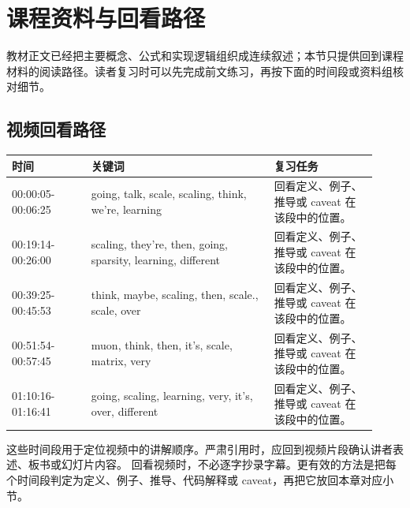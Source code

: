 \documentclass[a4paper]{article}
\begin{document}
\section{课程资料与回看路径}
教材正文已经把主要概念、公式和实现逻辑组织成连续叙述；本节只提供回到课程材料的阅读路径。读者复习时可以先完成前文练习，再按下面的时间段或资料组核对细节。
\subsection{视频回看路径}
\begin{longtable}{p{0.20\linewidth}p{0.46\linewidth}p{0.26\linewidth}}
\toprule
\textbf{时间} & \textbf{关键词} & \textbf{复习任务}\\
\midrule
00:00:05-00:06:25 & going, talk, scale, scaling, think, we're, learning & 回看定义、例子、推导或 caveat 在该段中的位置。\\
00:19:14-00:26:00 & scaling, they're, then, going, sparsity, learning, different & 回看定义、例子、推导或 caveat 在该段中的位置。\\
00:39:25-00:45:53 & think, maybe, scaling, then, scale., scale, over & 回看定义、例子、推导或 caveat 在该段中的位置。\\
00:51:54-00:57:45 & muon, think, then, it's, scale, matrix, very & 回看定义、例子、推导或 caveat 在该段中的位置。\\
01:10:16-01:16:41 & going, scaling, learning, very, it's, over, different & 回看定义、例子、推导或 caveat 在该段中的位置。\\
\bottomrule
\end{longtable}
这些时间段用于定位视频中的讲解顺序。严肃引用时，应回到视频片段确认讲者表述、板书或幻灯片内容。
回看视频时，不必逐字抄录字幕。更有效的方法是把每个时间段判定为定义、例子、推导、代码解释或 caveat，再把它放回本章对应小节。
\end{document}
